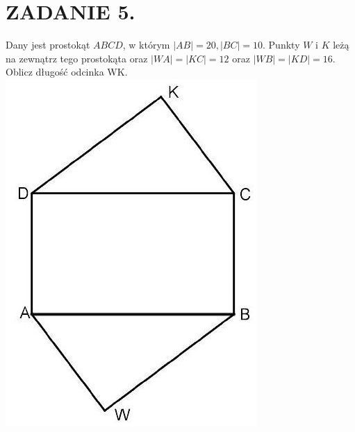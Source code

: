 \documentclass[10pt]{article}
\begin{document}
\section*{ZADANIE 5.}
Dany jest prostokąt \(A B C D\), w którym \(|A B|=20,|B C|=10\). Punkty \(W\) i \(K\) leżą na zewnątrz tego prostokąta oraz \(|W A|=|K C|=12\) oraz \(|W B|=|K D|=16\). Oblicz długość odcinka WK.\\
\includegraphics[max width=\textwidth, center]{2024_11_21_d7e50f3a037c14077f6eg-1}
\end{document}

